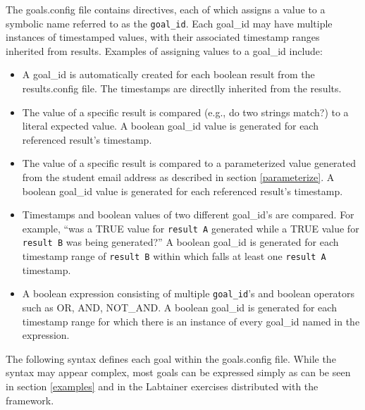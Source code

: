 \documentclass[12pt]{article}
\begin{document}
The goals.config file contains directives, each of which assigns a value to a symbolic name referred
to as the {\tt goal\_id}.  Each goal\_id may have multiple instances of timestamped values, with their
associated timestamp ranges inherited from results.  Examples of assigning values to a goal\_id include:
\begin{itemize}
\item A goal\_id is automatically created for each boolean result from the results.config file.  The timestamps
are directlly inherited from the results.

\item The value of a specific result is compared (e.g., do two strings match?) to a literal expected value.
A boolean goal\_id value is generated for each referenced result's timestamp.

\item The value of a specific result is compared to a parameterized value
generated from the student email address as described in section \ref{parameterize}.
A boolean goal\_id value is generated for each referenced result's timestamp.

\item Timestamps and boolean values of two different goal\_id's are compared.  For example, ``was
a TRUE value for {\tt result A} generated while a TRUE value for {\tt result B} was being generated?''  
A boolean goal\_id is generated for each
timestamp range of {\tt result B} within which falls at least one {\tt result A} timestamp.

\item A boolean expression consisting of multiple {\tt goal\_id}'s and boolean operators such as OR, AND, NOT\_AND.
A boolean goal\_id is generated for each timestamp range for which there is an instance of every goal\_id named
in the expression.
\end{itemize}

The following syntax defines each goal within the goals.config file.  While the syntax
may appear complex, most goals can be expressed simply as can be seen in section \ref{examples} and
in the Labtainer exercises distributed with the framework.
\end{document}
